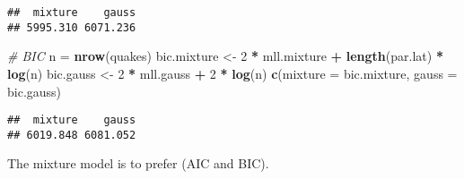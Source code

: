 \documentclass[
]{article}
\newenvironment{Shaded}{\begin{snugshade}}{\end{snugshade}}
\newcommand{\CommentTok}[1]{\textcolor[rgb]{0.56,0.35,0.01}{\textit{#1}}}
\newcommand{\DataTypeTok}[1]{\textcolor[rgb]{0.13,0.29,0.53}{#1}}
\newcommand{\DecValTok}[1]{\textcolor[rgb]{0.00,0.00,0.81}{#1}}
\newcommand{\KeywordTok}[1]{\textcolor[rgb]{0.13,0.29,0.53}{\textbf{#1}}}
\newcommand{\NormalTok}[1]{#1}
\newcommand{\OperatorTok}[1]{\textcolor[rgb]{0.81,0.36,0.00}{\textbf{#1}}}
\newcommand{\OtherTok}[1]{\textcolor[rgb]{0.56,0.35,0.01}{#1}}
\newcommand{\StringTok}[1]{\textcolor[rgb]{0.31,0.60,0.02}{#1}}
\begin{document}
\begin{Shaded}
\end{Shaded}

\begin{verbatim}
##  mixture    gauss 
## 5995.310 6071.236
\end{verbatim}

\begin{Shaded}
\begin{Highlighting}[]
\CommentTok{# BIC}
\NormalTok{n =}\StringTok{ }\KeywordTok{nrow}\NormalTok{(quakes)}
\NormalTok{bic.mixture <-}\StringTok{ }\DecValTok{2} \OperatorTok{*}\StringTok{ }\NormalTok{mll.mixture }\OperatorTok{+}\StringTok{ }\KeywordTok{length}\NormalTok{(par.lat) }\OperatorTok{*}\StringTok{ }\KeywordTok{log}\NormalTok{(n)}
\NormalTok{bic.gauss <-}\StringTok{ }\DecValTok{2} \OperatorTok{*}\StringTok{ }\NormalTok{mll.gauss }\OperatorTok{+}\StringTok{ }\DecValTok{2} \OperatorTok{*}\StringTok{ }\KeywordTok{log}\NormalTok{(n)}
\KeywordTok{c}\NormalTok{(}\DataTypeTok{mixture =}\NormalTok{ bic.mixture, }\DataTypeTok{gauss =}\NormalTok{ bic.gauss)}
\end{Highlighting}
\end{Shaded}

\begin{verbatim}
##  mixture    gauss 
## 6019.848 6081.052
\end{verbatim}

The mixture model is to prefer (AIC and BIC).
\end{document}
